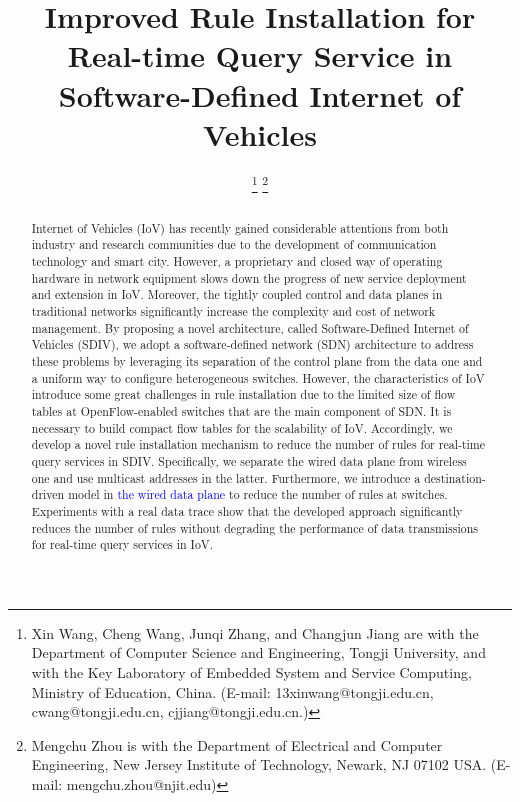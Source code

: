 \documentclass[journal]{IEEEtran}
\begin{document}
\newcommand{\tabincell}[2]{\begin{tabular}{@{}#1@{}}#2\end{tabular}}

\title{Improved Rule Installation for Real-time Query Service in Software-Defined Internet of Vehicles}

\author{
\thanks{Xin Wang, Cheng Wang, Junqi Zhang, and Changjun Jiang are with the Department of Computer Science and Engineering, Tongji University, and with the Key Laboratory of Embedded System and Service Computing, Ministry of Education, China. (E-mail: 13xinwang@tongji.edu.cn, cwang@tongji.edu.cn, cjjiang@tongji.edu.cn.)}
\thanks{Mengchu Zhou is with the Department of Electrical and Computer Engineering, New Jersey Institute of Technology, Newark, NJ 07102 USA. (E-mail: mengchu.zhou@njit.edu)}
}

\maketitle


\begin{abstract}
Internet of Vehicles (IoV) has recently gained considerable attentions from both industry and research communities due to the development of communication technology and smart city. However, a proprietary and closed way of operating hardware in network equipment slows down the progress of new service deployment and extension in IoV. Moreover, the tightly coupled control and data planes in traditional networks significantly increase the complexity and cost of network management. By proposing a novel architecture, called Software-Defined Internet of Vehicles (SDIV), we adopt a software-defined network (SDN) architecture to address these problems by leveraging its separation of the control plane from the data one and a uniform way to configure heterogeneous switches. However, the characteristics of IoV introduce some great challenges in rule installation due to the limited size of flow tables at OpenFlow-enabled switches that are the main component of SDN. It is necessary to build compact flow tables for the scalability of IoV. Accordingly, we develop a novel rule installation mechanism to reduce the number of rules for real-time query services in SDIV. Specifically, we separate the wired data plane from wireless one and use multicast addresses in the latter. Furthermore, we introduce a destination-driven model in \textcolor{blue}{the wired data plane} to reduce the number of rules at switches. Experiments with a real data trace show that the developed approach significantly reduces the number of rules without degrading the performance of data transmissions for  real-time query services in IoV.
\end{abstract}
\end{document}
